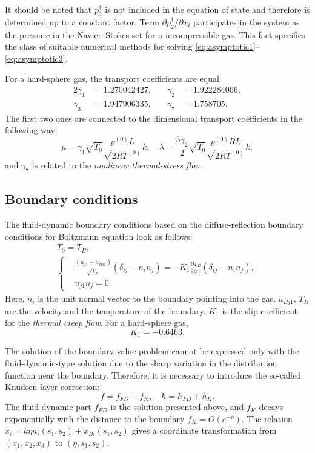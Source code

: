 \documentclass[smallextended, referee]{svjour3} %
\newcommand{\pder}[2][]{\frac{\partial#1}{\partial#2}}
\begin{document}
It should be noted that \(p_2^\dag\) is not included in the equation of state and
therefore is determined up to a constant factor.
Term \(\partial{p_2 ^ \dag} / \partial{x_i}\) participates in the system as the pressure
in the Navier--Stokes set for a incompressible gas.
This fact specifies the class of suitable numerical methods
for solving \eqref{eq:asymptotic1}--\eqref{eq:asymptotic3}.

For a hard-sphere gas, the transport coefficients are equal
\begin{alignat*}{2}
	\gamma_1 &= 1.270042427, &\quad \gamma_2 &= 1.922284066, \\
	\gamma_3 &= 1.947906335, &\quad \gamma_7 &= 1.758705.
\end{alignat*}
The first two ones are connected to the dimensional transport coefficients in the following way:
\begin{equation}
	\mu = \gamma_1\sqrt{T_0} \frac{p^{(0)}L}{\sqrt{2RT^{(0)}}} k, \quad
	\lambda = \frac{5\gamma_2}{2}\sqrt{T_0} \frac{p^{(0)}RL}{\sqrt{2RT^{(0)}}} k,
\end{equation}	
and \(\gamma_7\) is related to the \emph{nonlinear thermal-stress flow}.

\subsection{Boundary conditions}

The fluid-dynamic boundary conditions based on the diffuse-reflection boundary conditions
for Boltzmann equation look as follows:
\begin{gather}
	T_0 = T_B, \label{eq:bound:T} \\
	\left\{
	\begin{aligned}
		& \frac{(u_{j1}-u_{Bj1})}{\sqrt{T_B}}(\delta_{ij}-n_in_j) = 
			-K_1\pder[T_B]{x_j}(\delta_{ij}-n_in_j), \\
		& u_{j1}n_j = 0.
	\end{aligned}
	\right. \label{eq:bound:v}
\end{gather}
Here, \(n_i\) is the unit normal vector to the boundary pointing into the gas,
\(u_{Bj1}\), \(T_B\) are the velocity and the temperature of the boundary.
\(K_1\) is the slip coefficient for the \emph{thermal creep flow}. For a hard-sphere gas,
\[ K_1 = -0.6463. \]

The solution of the boundary-value problem cannot be expressed only with the fluid-dynamic-type
solution due to the sharp variation in the distribution function near the boundary.
Therefore, it is necessary to introduce the so-called Knudsen-layer correction:
\begin{equation}
	f = f_{FD} + f_K, \quad h = h_{FD} + h_K.
\end{equation}
The fluid-dynamic part \(f_{FD}\) is the solution presented above,
and \(f_K\) decays exponentially with the distance to the boundary \(f_K = O\left(e^{-\eta}\right)\).
The relation \( x_i = k\eta n_i(s_1,s_2) + x_{Bi}(s_1, s_2) \) gives a coordinate transformation
from \((x_1,x_2,x_3)\) to \((\eta,s_1,s_2)\).
\end{document}
